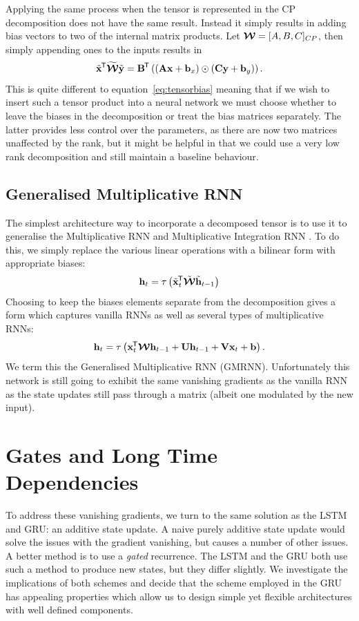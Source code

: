 Applying the same process when the tensor is represented in the CP decomposition does not
have the same result. Instead it simply results in adding bias vectors to two of the internal
matrix products. Let \(\bm{\mathcal{W}} = [A, B, C]_{CP}\), then simply appending ones to the inputs
results in
\begin{equation}
	\tilde{\mathbf{x}}^{\mkern-1.5mu\mathsf{T}}\widetilde{\bm{\mathcal{W}}}\tilde{\mathbf{y}}
	= \mathbf{B}^{\mkern-1.5mu\mathsf{T}}\left( (\mathbf{A}\mathbf{x} + \mathbf{b}_x) \odot (\mathbf{C}\mathbf{y} + \mathbf{b}_y)\right).
\end{equation} This is quite different to equation~\eqref{eq:tensorbias} meaning that if we wish to
insert such a tensor product into a neural network we must choose whether to leave the biases in
the decomposition or treat the bias matrices separately. The latter provides less control over the
parameters, as there are now two matrices unaffected by the rank, but it might be helpful in that we
could use a very low rank decomposition and still maintain a baseline behaviour.

\subsection{Generalised Multiplicative RNN}
The simplest architecture way to incorporate a decomposed tensor is to use it to generalise the
Multiplicative RNN and Multiplicative Integration RNN \autocite{Martens2011a, Wu2016}.
To do this, we simply replace the various linear operations with a bilinear form with appropriate
biases:
\begin{equation}\label{eq:gmrnn}
	\mathbf{h}_t = \tau\left( \tilde{\mathbf{x}}_t^{\mkern-1.5mu\mathsf{T}}\tilde{\bm{\mathcal{W}}}\tilde{\mathbf{h}}_{t-1} \right)
\end{equation}
Choosing to keep the biases elements separate from the decomposition gives a form which captures
vanilla RNNs as well as several types of multiplicative RNNs:
\begin{equation}\label{eq:gmrnnbias}
	\mathbf{h}_t = \tau\left(\mathbf{x}_t^{\mkern-1.5mu\mathsf{T}}\bm{\mathcal{W}}\mathbf{h}_{t-1}
		+ \mathbf{U}\mathbf{h}_{t-1} + \mathbf{V}\mathbf{x}_t + \mathbf{b}\right).
\end{equation} We term this the Generalised Multiplicative RNN (GMRNN). Unfortunately this
network is still going to exhibit the same vanishing gradients as the vanilla RNN as the state updates
still pass through a matrix (albeit one modulated by the new input).

\section{Gates and Long Time Dependencies}
To address these vanishing gradients, we turn to the same solution as the LSTM and GRU: an additive state
update. A naive purely additive state update would solve the issues with the gradient vanishing, but
causes a number of other issues. A better method is to use a \emph{gated} recurrence. The LSTM and
the GRU both use such a method to produce new states, but they differ slightly. We investigate
the implications of both schemes and decide that the scheme employed in the GRU has appealing 
properties which allow us to design simple yet flexible architectures with well defined components.

